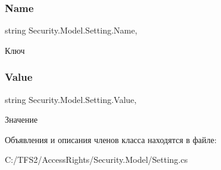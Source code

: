 \subsubsection{\texorpdfstring{Name}{Name}}
{\footnotesize\ttfamily string Security.\+Model.\+Setting.\+Name\hspace{0.3cm}{\ttfamily [get]}, {\ttfamily [set]}}



Ключ 

\mbox{\label{class_security_1_1_model_1_1_setting_ace5141b561fd0a150a8342d17faf79d7}} 
\subsubsection{\texorpdfstring{Value}{Value}}
{\footnotesize\ttfamily string Security.\+Model.\+Setting.\+Value\hspace{0.3cm}{\ttfamily [get]}, {\ttfamily [set]}}



Значение 



Объявления и описания членов класса находятся в файле\+:\begin{DoxyCompactItemize}
\item 
C\+:/\+T\+F\+S2/\+Access\+Rights/\+Security.\+Model/Setting.\+cs\end{DoxyCompactItemize}
